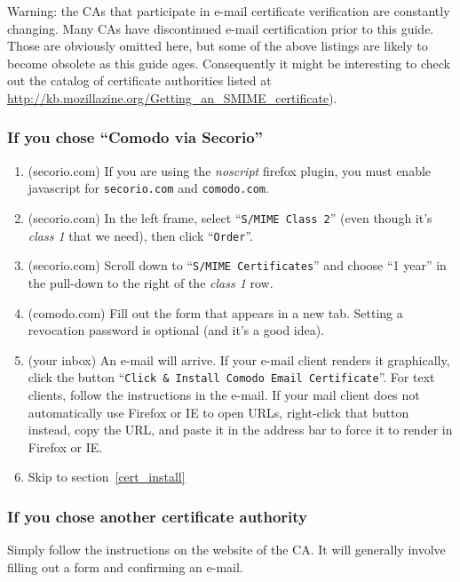 \documentclass[pdftex,12pt,titlepage=false]{scrartcl}
\begin{document}
{\tiny Warning: the CAs that participate in e-mail certificate
  verification are constantly changing.  Many CAs have discontinued
  e-mail certification prior to this guide.  Those are obviously
  omitted here, but some of the above listings are likely to become
  obsolete as this guide ages.  Consequently it might be interesting
  to check out the catalog of certificate authorities listed at
  \url{http://kb.mozillazine.org/Getting_an_SMIME_certificate}).}
\newpage
\subsubsection{If you chose ``Comodo via Secorio''}
\begin{multicols}{2}
  \begin{enumerate}
  \item (secorio.com) If you are using the \emph{noscript} firefox
    plugin, you must enable javascript for \texttt{secorio.com} and
    \texttt{comodo.com}.
  \item (secorio.com) In the left frame, select ``\texttt{S/MIME Class
      2}'' (even though it's \emph{class 1} that we need), then click
    ``\texttt{Order}''.
  \item (secorio.com) Scroll down to ``\texttt{S/MIME Certificates}''
    and choose ``1 year'' in the pull-down to the right of the
    \emph{class 1} row.
  \item (comodo.com) Fill out the form that appears in a new tab.
    Setting a revocation password is optional (and it's a good
    idea).%
  \item (your inbox) An e-mail will arrive.  If your e-mail client
    renders it graphically, click the button ``\texttt{Click \&
      Install Comodo Email Certificate}''.  For text clients, follow
    the instructions in the e-mail.  If your mail client does not
    automatically use Firefox or IE to open URLs, right-click that
    button instead, copy the URL, and paste it in the address bar to
    force it to render in Firefox or IE.
  \item Skip to section~\ref{cert_install}
  \end{enumerate}
\end{multicols}

\subsubsection{If you chose another certificate authority}
Simply follow the instructions on the website of the CA.  It will
generally involve filling out a form and confirming an e-mail.
\end{document}

